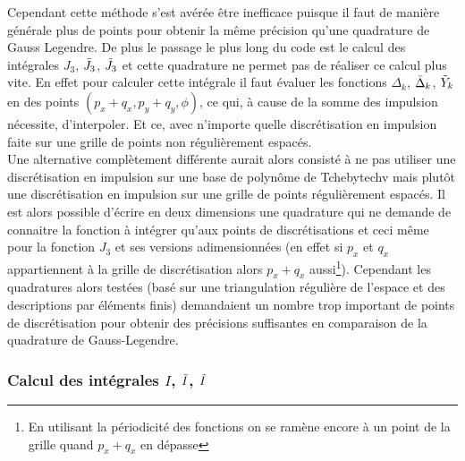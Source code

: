 \documentclass[10pt]{article}
\begin{document}
\begin{multicols}{2}
Cependant cette méthode s'est avérée être inefficace puisque il faut de manière générale plus de points pour obtenir la même précision qu'une quadrature de Gauss Legendre. De plus le passage le plus long du code est le calcul des intégrales $J_3$, $\bar{J}_3$, $\tilde{J}_3$ et cette quadrature ne permet pas de réaliser ce calcul plus vite. En effet pour calculer cette intégrale il faut évaluer les fonctions $\Delta_k$, $\bar{\Delta}_k$, $\tilde{Y}_k$ en des points $(p_x+q_x, p_y+q_y,\phi)$, ce qui, à cause de la somme des impulsion nécessite, d'interpoler. Et ce, avec n'importe quelle discrétisation en impulsion faite sur une grille de points non régulièrement espacés. \\

Une alternative complètement différente aurait alors consisté à ne pas utiliser une discrétisation en impulsion sur une base de polynôme de Tchebytechv mais plutôt une discrétisation en impulsion sur une grille de points régulièrement espacés. Il est alors possible d'écrire en deux dimensions une quadrature qui ne demande de connaitre la fonction à intégrer qu'aux points de discrétisations et ceci même pour la fonction $J_3$ et ses versions adimensionnées (en effet si  $p_x$ et $q_x$ appartiennent à la grille de discrétisation alors $p_x+q_x$ aussi\footnote{En utilisant la périodicité des fonctions on se ramène encore à un point de la grille quand $p_x+q_x$ en dépasse}). Cependant les quadratures alors testées (basé sur une triangulation régulière de l'espace et des descriptions par éléments finis) demandaient un nombre trop important de points de discrétisation pour obtenir des précisions suffisantes en comparaison de la quadrature de Gauss-Legendre.


\vspace*{11pt}



\subsubsection{Calcul des intégrales $I$, $\bar{I}$, $\tilde{I}$}


\end{multicols}
\end{document}
